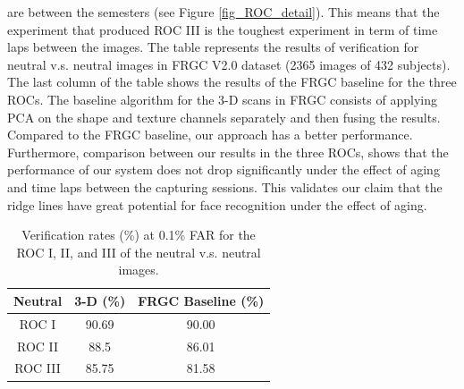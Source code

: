 are between the semesters (see Figure \ref{fig_ROC_detail}). This
means that the experiment that produced ROC III is the toughest
experiment in term of time laps between the images. The table
represents the results of verification for neutral v.s. neutral
images in FRGC V2.0 dataset (2365 images of 432 subjects). The last
column of the table shows the results of the FRGC baseline for the
three ROCs. The baseline algorithm for the 3-D scans in FRGC
consists of applying PCA on the shape and texture channels
separately and then fusing the results. Compared to the FRGC
baseline, our approach has a better performance. Furthermore,
comparison between our results in the three ROCs, shows that the
performance of our system does not drop significantly under the
effect of aging and time laps between the capturing sessions. This
validates our claim that the ridge lines have great potential for
face recognition under the effect of aging.
\begin{table}{}
\begin{center}
\begin{tabular}{|c|c|c|}
 \hline
\textbf{Neutral}& 3-D (\%)& FRGC Baseline (\%)\\
\hline \hline
ROC I &90.69&90.00\\
ROC II &88.5&86.01\\
ROC III &85.75&81.58\\
\hline
\end{tabular} \caption{Verification rates (\%) at 0.1\% FAR for the ROC I, II, and III of the neutral v.s. neutral
images.}\label{table_ROC_3-D}
\end{center}
\end{table}

